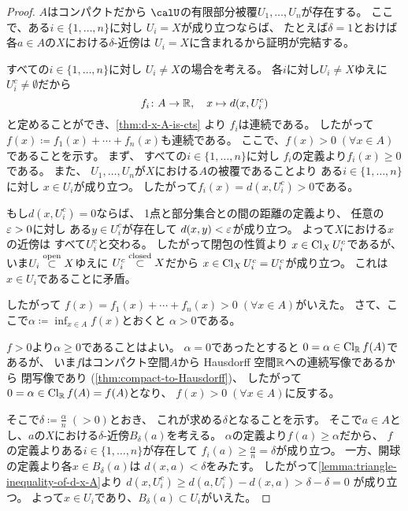 \documentclass[report]{jlreq}
\begin{document}
\begin{proof}
    $A$はコンパクトだから
    $\calU$の有限部分被覆$U_1, \ldots, U_n$が存在する。
    ここで、ある$i \in \{ 1, \ldots, n \}$に対し
    $U_i = X$が成り立つならば、
    たとえば$\delta = 1$とおけば
    各$a \in A$の$X$における$\delta$-近傍は
    $U_i = X$に含まれるから証明が完結する。

    すべての$i \in \{ 1, \ldots, n \}$に対し
    $U_i \neq X$の場合を考える。
    各$i$に対し$U_i \neq X$ゆえに$U_i^c \neq \emptyset$だから
    \begin{equation}
        f_i \colon A \to \mathbb{R},
            \quad
            x \mapsto d(x, U_i^c)
    \end{equation}
    と定めることができ、\cref{thm:d-x-A-is-cts} より
    $f_i$は連続である。
    したがって$f(x) \coloneqq f_1(x) + \cdots + f_n(x)$も連続である。
    ここで、$f(x) > 0 \; (\forall x \in A)$であることを示す。
    まず、
    すべての$i \in \{ 1, \ldots, n \}$に対し
    $f_i$の定義より$f_i(x) \ge 0$である。
    また、
    $U_1, \ldots, U_n$が$X$における$A$の被覆であることより
    ある$i \in \{ 1, \ldots, n \}$に対し
    $x \in U_i$が成り立つ。
    したがって$f_i(x) = d(x, U_i^c) > 0$である。
    \begin{innerproof}
        もし$d(x, U_i^c) = 0$ならば、
        1点と部分集合との間の距離の定義より、
        任意の$\varepsilon > 0$に対し
        ある$y \in U_i^c$が存在して
        $d(x, y) < \varepsilon$が成り立つ。
        よって$X$における$x$の近傍は
        すべて$U_i^c$と交わる。
        したがって閉包の性質より
        $x \in \operatorname{Cl}_X U_i^c$であるが、
        いま$U_i \stackrel{\text{open}}{\subset} X$ゆえに
        $U_i^c \stackrel{\text{closed}}{\subset} X$だから
        $x \in \operatorname{Cl}_X U_i^c = U_i^c$が成り立つ。
        これは$x \in U_i$であることに矛盾。
    \end{innerproof}
    したがって
    $f(x) = f_1(x) + \cdots + f_n(x) > 0 \; (\forall x \in A)$がいえた。
    さて、ここで$\alpha \coloneqq \inf_{x \in A} f(x)$とおくと
    $\alpha > 0$である。
    \begin{innerproof}
        $f > 0$より$\alpha \ge 0$であることはよい。
        $\alpha = 0$であったとすると
        $0 = \alpha \in \operatorname{Cl}_{\mathbb{R}} f(A)$であるが、
        いま$f$はコンパクト空間$A$から Hausdorff 空間$\mathbb{R}$への連続写像であるから
        閉写像であり (\cref{thm:compact-to-Hausdorff})、
        したがって$0 = \alpha \in \operatorname{Cl}_{\mathbb{R}} f(A) = f(A)$となり、
        $f(x) > 0 \; (\forall x \in A)$に反する。
    \end{innerproof}
    そこで$\delta \coloneqq \frac{\alpha}{n} \; (> 0)$とおき、
    これが求める$\delta$となることを示す。
    そこで$a \in A$とし、$a$の$X$における$\delta$-近傍$B_\delta (a)$を考える。
    $\alpha$の定義より$f(a) \ge \alpha$だから、
    $f$の定義よりある$i \in \{ 1, \ldots, n \}$が存在して
    $f_i(a) \ge \frac{\alpha}{n} = \delta$が成り立つ。
    一方、開球の定義より各$x \in B_\delta (a)$は
    $d(x, a) < \delta$をみたす。
    したがって\cref{lemma:triangle-inequality-of-d-x-A}より
    $d(x, U_i^c) \ge d(a, U_i^c) - d(x, a) > \delta - \delta = 0$
    が成り立つ。
    よって$x \in U_i$であり、$B_\delta (a) \subset U_i$がいえた。
\end{proof}
\end{document}
